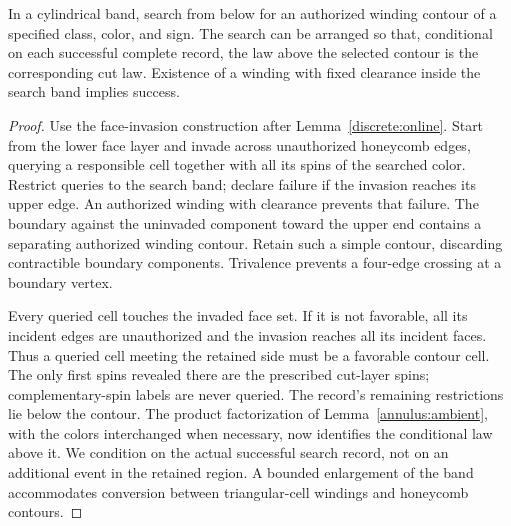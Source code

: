 \begin{lemma}\label{annulus:search}
In a cylindrical band, search from below for an authorized winding contour
of a specified class, color, and sign. The search can be arranged so that,
conditional on each successful complete record, the law above the selected
contour is the corresponding cut law. Existence of a winding with fixed
clearance inside the search band implies success.
\end{lemma}
\begin{proof}
Use the face-invasion construction after Lemma~\ref{discrete:online}.
Start from the lower face layer and invade across unauthorized honeycomb
edges, querying a responsible cell together with all its spins of the
searched color. Restrict queries to the search band; declare failure if
the invasion reaches its upper edge. An authorized winding with clearance
prevents that failure. The boundary against the uninvaded component toward
the upper end contains a separating authorized winding contour. Retain
such a simple contour, discarding contractible boundary components.
Trivalence prevents a four-edge crossing at a boundary vertex.

Every queried cell touches the invaded face set. If it is not favorable,
all its incident edges are unauthorized and the invasion reaches all its
incident faces. Thus a queried cell meeting the retained side must be a
favorable contour cell. The only first spins revealed there are the
prescribed cut-layer spins; complementary-spin labels are never queried.
The record's remaining restrictions lie below the contour. The product
factorization of Lemma~\ref{annulus:ambient}, with the colors interchanged
when necessary, now identifies the conditional law above it. We condition
on the actual successful search record, not on an additional event in the
retained region. A bounded enlargement of the band accommodates conversion
between triangular-cell windings and honeycomb contours.
\end{proof}

